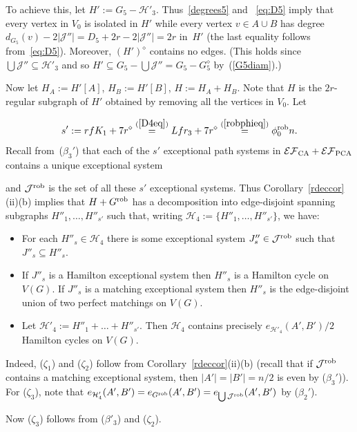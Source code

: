 \documentclass{memo-l}
\def\COMMENT#1{}
\def\cJ{\mathcal{J}}
\numberwithin{section}{chapter}
\numberwithin{equation}{section}
\numberwithin{firstthm}{section}
\numberwithin{figure}{section}
\begin{document}
{To achieve this, let $H':=G_5-\mathcal{H}'_3$. Thus~\eqref{degrees5} and ~\eqref{eq:D5} imply that
every vertex in $V_0$ is isolated in $H'$ while every vertex $v\in A\cup B$ has degree $d_{G_5}(v)-2|\cJ''|=D_5+2r-2|\cJ''|=2r$ in~$H'$
(the last equality follows from~\eqref{eq:D5}). Moreover, $(H')^{\diamond}$ contains no edges. (This holds
since $\bigcup \cJ''\subseteq \mathcal{H}'_3$ and so $H'\subseteq G_5-\bigcup \cJ''= G_5- G_5^{\diamond}$ by~(\ref{G5diam}).)%
    \COMMENT{Daniela: added back reference}
Now let $H_A:=H'[A]$, $H_B:=H'[B]$, $H:=H_A+H_B$. 
Note that $H$ is the $2r$-regular subgraph of $H'$ obtained by removing all the vertices in $V_0$.
Let%
\COMMENT{Daniela: made extra back reference + added one more step}
$$
s':=rfK_1+7r^\diamond \stackrel{(\ref{D4eq})}{=}Lfr_3+7r^\diamond \stackrel{(\ref{robphieq})}{=}\phi_0^{\rm rob} n.
$$
Recall from~($\beta_3'$) that each of the $s'$ exceptional path systems in $\mathcal{EF}_{\rm CA}+\mathcal{EF}_{\rm PCA}$ contains
a unique exceptional system%
\COMMENT{Deryk strengthened ($\beta_3'$) to make reference to ($\beta_3$) superfluous}
and  $\cJ^{\rm rob}$ is the set of all these $s'$ exceptional systems.
Thus Corollary~\ref{rdeccor}(ii)(b) implies that $H + G^{\rm rob}$ has a decomposition into
edge-disjoint spanning subgraphs
$H''_1,\dots,H''_{s'}$ such that, writing $\mathcal{H}_4:=\{H''_1,\dots,H''_{s'}\}$,
we have:%
   \COMMENT{Daniela: deleted "If $e_G(A',B') < D$" in ($\zeta_3$) since it holds in general}
\begin{itemize}
\item[($\zeta_1$)] For each $H''_s\in \mathcal{H}_4$ there is some exceptional system $J''_s\in \cJ^{\rm rob}$ such that $J''_s\subseteq H''_s$.
\item[($\zeta_2$)] If $J''_s$ is a Hamilton exceptional system then $H''_s$ is a Hamilton cycle on $V(G)$. If
$J''_s$ is a matching exceptional system then $H''_s$ is the edge-disjoint union of two perfect matchings on $V(G)$.
\item[($\zeta_3$)] Let $\mathcal{H}'_4:=H''_1+\dots+H''_{s'}$. Then $\mathcal{H}_4$ contains precisely
$e_{\mathcal{H}'_4}(A',B')/2$ Hamilton cycles on $V(G)$.
\end{itemize}
Indeed, ($\zeta_1$) and ($\zeta_2$) follow from Corollary~\ref{rdeccor}(ii)(b)
(recall that if $\cJ^{\rm rob}$ contains a matching exceptional system, then $|A'|=|B'|=n/2$ is even by ($\beta_3'$)).
For ($\zeta_3$), note that $e_{\mathcal{H}'_4}(A',B')=  e_{G^{\rm rob}}(A',B')= e_{\bigcup\cJ^{\rm rob}}(A',B')$ by ($\beta_2'$).%
   \COMMENT{Daniela: replaced $e_{\cJ^{\rm rob}}(A',B')$ by $e_{\bigcup\cJ^{\rm rob}}(A',B')$}
Now ($\zeta_3$) follows from ($\beta'_3$) and ($\zeta_2$). 


}
\end{document}
